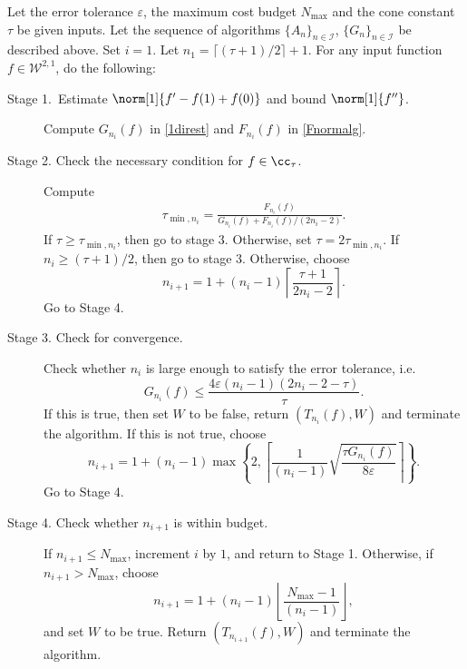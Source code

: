 \begin{algo} \label{multistageintegalgo}
Let the error tolerance $\varepsilon$, the maximum cost budget $N_{\text{max}}$ and the cone constant $\tau$ be given inputs. Let the sequence of algorithms $\{A_n\}_{n\in \mathcal{I}}$, $\{G_n\}_{n\in \mathcal{I}}$ be described above. Set $i=1$. Let $n_1=\lceil(\tau+1)/2\rceil+1$. For any input function $f\in \mathcal{W}^{2,1}$, do the following:
\begin{description}
\item[Stage 1.\ Estimate {$\norm[1]{f'-f(1)+f(0)}$} and bound {$\norm[1]{f''}$}.] Compute $G_{n_i}(f)$ in \eqref{1direst} and $F_{n_i}(f)$ in \eqref{Fnormalg}.

\item[Stage 2. Check the necessary condition for $f \in \cc_{\tau}$.] Compute 
    \begin{align*}
     \tau_{\min,n_i} =  \frac{F_{n_i}(f)}{G_{n_i}(f)+F_{n_i}(f)/(2n_i-2)}.
    \end{align*}
If $\tau \ge \tau_{\min,n_i}$, then go to stage 3.  Otherwise, set $\tau = 2\tau_{\min,n_i}$.  If $n_i \ge (\tau+1)/2$, then go to stage 3.  Otherwise, choose 
$$
n_{i+1}=1+ (n_i-1)\left\lceil\frac{\tau+1}{2n_i-2}\right\rceil.
$$
Go to Stage 4.

\item[Stage 3. Check for convergence.] Check whether $n_i$ is large enough to satisfy the error tolerance, i.e.
    \begin{equation*}
     G_{n_i}(f) \le \frac{4\varepsilon(n_i-1)(2n_i-2 - \tau)}{\tau}.
    \end{equation*}
If this is true, then set $W$ to be false, return $(T_{n_i}(f),W)$ and terminate the algorithm.   If this is not true, choose
$$
n_{i+1}=1+ (n_i-1)\max\left\{2,\left\lceil\frac{1}{(n_i-1)}\sqrt{\frac{\tau G_{n_i}(f)}{8\varepsilon}}\right\rceil\right\}.
$$
Go to Stage 4.

\item[Stage 4. Check whether $n_{i+1}$ is within budget.] If $n_{i+1} \le N_{\max}$, increment $i$ by $1$, and return to Stage 1.  Otherwise, if $n_{i+1} > N_{\max}$, choose 
$$
n_{i+1}=1+ (n_i-1)\left\lfloor\frac{N_{\max}-1}{(n_i-1)}\right\rfloor,
$$
and set $W$ to be true. Return $(T_{n_{i+1}}(f),W)$ and terminate the algorithm.
\end{description}
\end{algo}

